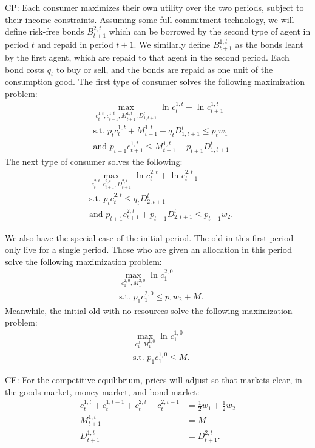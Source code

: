 \documentclass[11pt]{article} %
\begin{document}
CP: Each consumer maximizes their own utility over the two periods, subject to their income constraints. Assuming some full commitment technology, we will define risk-free bonds $B_{t+1}^{2,t}$ which can be borrowed by the second type of agent in period $t$ and repaid in period $t+1$. We similarly define $B_{t+1}^{1,t}$ as the bonds leant by the first agent, which are repaid to that agent in the second period. Each bond costs $q_t$ to buy or sell, and the bonds are repaid as one unit of the consumption good.
The first type of consumer solves the following maximization problem:
\begin{align*}
&\max_{c_t^{1,t},c_{t+1}^{1,t},M_{t+1}^{1,t},D_{1,t+1}^t} \text{ ln } c_{t}^{1,t} + \text{ ln } c_{t+1}^{1,t}\\
&\text{s.t. }  p_t c_{t}^{1,t} + M_{t+1}^{1,t}  + q_tD_{1,t+1}^{t}\leq p_t w_1 \\
& \text{and } p_{t+1} c_{t+1}^{1,t} \leq M_{t+1}^{1,t}+ p_{t+1}D_{1,t+1}^{t}
\end{align*}
The next type of consumer solves the following:
\begin{align*}
&\max_{c_t^{2,t},c_{t+1}^{2,t},D_{t+1}^{2,t}} \text{ ln } c_{t}^{2,t} + \text{ ln } c_{t+1}^{2,t}\\
&\text{s.t. }  p_t c_{t}^{2,t}  \leq q_tD_{2,t+1}^{t} \\
& \text{and } p_{t+1} c_{t+1}^{2,t} + p_{t+1}D_{2,t+1}^{t}\leq p_{t+1}w_2.
\end{align*}

We also have the special case of the initial period. The old in this first period only live for a single period. Those who are given an allocation in this period solve the following maximization problem:
\begin{align*}
&\max_{c_{1}^{2,0},M_1^{2,0}} \text{ ln } c_{1}^{2,0} \\
&\text{s.t. }  p_1 c_{1}^{2,0} \leq p_1 w_2 + M.
\end{align*}
Meanwhile, the initial old with no resources solve the following maximization problem:
\begin{align*}
&\max_{c_{1}^{0},M_{1}^{1,0}} \text{ ln } c_{1}^{1,0} \\
&\text{s.t. }  p_1 c_{1}^{1,0} \leq M.
\end{align*}

CE: For the competitive equilibrium, prices will adjust so that markets clear, in the goods market, money market, and bond market:
\begin{align*}
c_{t}^{1,t} +  c_{t}^{1,t-1} + c_{t}^{2,t} +  c_{t}^{2,t-1} &= \frac{1}{2}w_1 + \frac{1}{2} w_2 \\
M_{t+1}^{1,t}  &= M\\
D_{t+1}^{1,t} &= D_{t+1}^{2,t}.
\end{align*}
\end{document}
